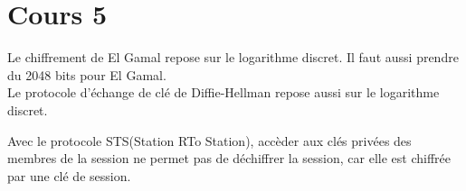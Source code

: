 \section{Cours 5}
Le chiffrement de El Gamal repose sur le logarithme discret. Il faut aussi prendre du 2048 bits pour El Gamal.\\
Le protocole d'échange de clé de Diffie-Hellman repose aussi sur le logarithme discret.

Avec le protocole STS(Station RTo Station), accèder aux clés privées des membres de la session ne permet pas de
déchiffrer la session, car elle est chiffrée par une clé de session.

